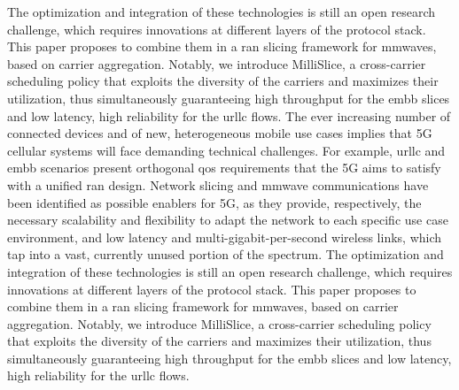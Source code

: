 \documentclass[a4paper, 11pt, oneside]{article}
\begin{document}
  The optimization and integration of these technologies is still an open research challenge, which requires innovations at different layers of the protocol stack. This paper proposes to combine them in a \gls{ran} slicing framework for \glspl{mmwave}, based on carrier aggregation. Notably, we introduce MilliSlice, a cross-carrier scheduling policy that exploits the diversity of the carriers and maximizes their utilization, thus simultaneously guaranteeing high throughput for the \gls{embb} slices and low latency, high reliability for the \gls{urllc} flows.
    The ever increasing number of connected devices and of new, heterogeneous mobile use cases implies that 5G cellular systems will face demanding technical challenges. For example, \gls{urllc} and \gls{embb} scenarios present orthogonal \gls{qos} requirements that the 5G aims to satisfy with a unified \gls{ran} design. Network slicing and \gls{mmwave} communications have been identified as possible enablers for 5G, as they provide, respectively, the necessary scalability and flexibility to adapt the network to each specific use case environment, and low latency and multi-gigabit-per-second wireless links, which tap into a vast, currently unused portion of the spectrum.
  The optimization and integration of these technologies is still an open research challenge, which requires innovations at different layers of the protocol stack. This paper proposes to combine them in a \gls{ran} slicing framework for \glspl{mmwave}, based on carrier aggregation. Notably, we introduce MilliSlice, a cross-carrier scheduling policy that exploits the diversity of the carriers and maximizes their utilization, thus simultaneously guaranteeing high throughput for the \gls{embb} slices and low latency, high reliability for the \gls{urllc} flows.
\end{document}
